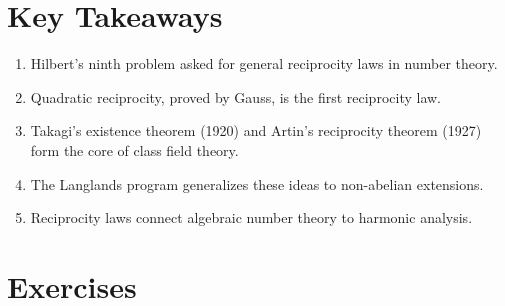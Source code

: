 \section*{Key Takeaways}

\begin{enumerate}
    \item Hilbert's ninth problem asked for general reciprocity laws in number theory.
    \item Quadratic reciprocity, proved by Gauss, is the first reciprocity law.
    \item Takagi's existence theorem (1920) and Artin's reciprocity theorem (1927) form the core of class field theory.
    \item The Langlands program generalizes these ideas to non-abelian extensions.
    \item Reciprocity laws connect algebraic number theory to harmonic analysis.
\end{enumerate}

\section*{Exercises}

